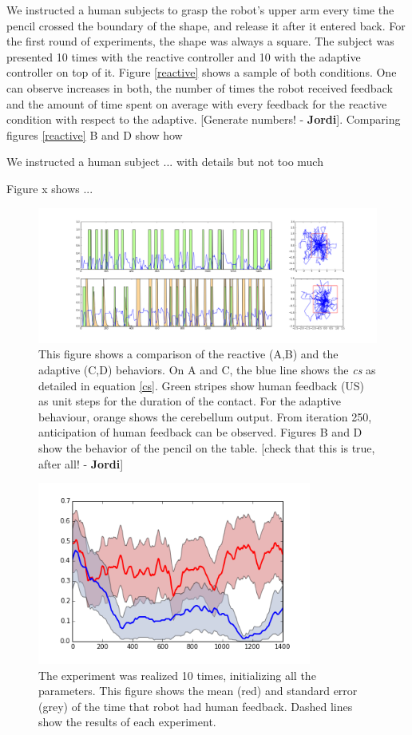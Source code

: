 \documentclass[letterpaper, 10 pt, conference]{ieeeconf}  %
\newcommand\jp[1]{{\color{red}}{\color{red}}{\footnotesize \color{red}[#1 - \textbf{Jordi}]}} %
\begin{document}
{We instructed a human subjects to grasp the robot's upper arm every time the pencil crossed the boundary of the shape, and release it after it entered back. For the first round of experiments, the shape was always a square. The subject was presented 10 times with the reactive controller and 10 with the adaptive controller on top of it. 
Figure \ref{reactive} shows a sample of both conditions. One can observe increases in both, the number of times the robot received feedback and the amount of time spent on average with every feedback for the reactive condition with respect to the adaptive. \jp{Generate numbers!}. Comparing figures \ref{reactive} B and D show how

We instructed a human subject ...
with details but not too much

Figure x shows ...


\begin{figure}[bc]
\centering
\includegraphics[width=20cm]{reactive_adaptive}
\caption{This figure shows a comparison of the reactive (A,B) and the adaptive (C,D) behaviors. On A and C, the blue line shows the \emph{cs} as detailed in equation \ref{cs}. Green stripes show human feedback (US) as unit steps for the duration of the contact. For the adaptive behaviour, orange shows the cerebellum output. From iteration 250, anticipation of human feedback can be observed. Figures B and D show the behavior of the pencil on the table. \jp{check that this is true, after all!}}
\label{fig:reactive}
\end{figure}




\begin{figure}
\centering
\includegraphics[width=9cm]{error}
\caption{The experiment was realized 10 times, initializing all the parameters. This figure shows the mean (red) and standard error (grey) of the time that robot had human feedback. Dashed lines show the results of each experiment. }
\label{fig:error}
\end{figure}

}
\end{document}
